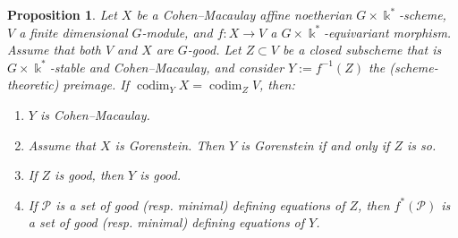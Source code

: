 \documentclass[11pt]{amsart}
\numberwithin{equation}{section}
\newtheorem{proposition}[equation]{Proposition}
\theoremstyle{definition}
\DeclareMathOperator{\codim}{codim}
\newcommand{\mc}{\mathcal}
\newcommand{\kk}{\Bbbk}
\begin{document}
\begin{proposition}\label{prop:main}
Let $X$ be a Cohen--Macaulay affine noetherian $G\times \kk^*$-scheme, $V$ a finite dimensional $G$-module, and $f: X \to V$ a $G \times \kk^*$-equivariant morphism. Assume that both $V$ and $X$ are $G$-good. Let $Z\subset V$ be a closed subscheme that is $G \times \kk^*$-stable and Cohen--Macaulay, and consider $Y:=f^{-1}(Z)$ the (scheme-theoretic) preimage. If $\codim_Y X = \codim_Z V$, then:
\begin{enumerate}
\item $Y$ is Cohen--Macaulay.
\item Assume that $X$ is Gorenstein. Then $Y$ is Gorenstein if and only if $Z$ is so.
\item If $Z$ is good, then $Y$ is good.
\item If $\mc{P}$ is a set of good (resp. minimal) defining equations of $Z$, then $f^{*}(\mc{P})$ is a set of good (resp. minimal) defining equations of $Y$.
\end{enumerate}
\end{proposition}
\end{document}
